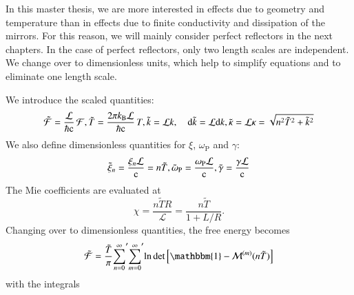 In this master thesis, we are more interested in effects due to geometry and
temperature than in effects due to finite conductivity and dissipation of the
mirrors. For this reason, we will mainly consider perfect reflectors in the
next chapters. In the case of perfect reflectors, only two length scales are
independent. We change over to dimensionless units, which help to simplify
equations and to eliminate one length scale.

We introduce the scaled quantities:
\begin{equation}
\label{eq:scattering_ps_scaled}
\tilde{\mathcal{F}} = \frac{\mathcal{L}}{\hbar \mathrm{c}} \, \mathcal{F}, \\
\tilde{T}           = \frac{2\pi k_\text{B} \mathcal{L}}{\hbar \mathrm{c}} \, T, \\
\tilde{k}           = \mathcal{L} k, \quad \mathrm{d}\tilde{k} = \mathcal{L} \mathrm{d}k, \\
\tilde{\kappa}      = \mathcal{L} \kappa = \sqrt{n^2 \tilde{T}^2 + \tilde{k}^2} \\
\end{equation}
We also define dimensionless quantities for $\xi$, $\omega_\text{P}$ and $\gamma$:
\begin{equation}
\tilde{\xi}_n           = \frac{\xi_n \mathcal{L}}{\mathrm{c}} = n \tilde{T}, \\
\tilde{\omega}_\text{P} = \frac{\omega_\text{P} \mathcal{L}}{\mathrm{c}}, \\
\tilde{\gamma}          = \frac{\gamma \mathcal{L}}{\mathrm{c}}
\end{equation}
The Mie coefficients are evaluated at
\begin{equation}
\chi = \frac{n\tilde{T}R}{\mathcal{L}} = \frac{n\tilde{T}}{1+L/R}.
\end{equation}
Changing over to dimensionless quantities, the free energy becomes
\begin{equation}
\tilde{\mathcal{F}} = \frac{\tilde{T}}{\pi} {\sum_{n=0}^\infty}^\prime {\sum_{m=0}^\infty}^\prime \log\det \left[ \mathbbm{1} - \mathcal{M}^{(m)}(n\tilde T)\right]
\end{equation}
with the integrals
